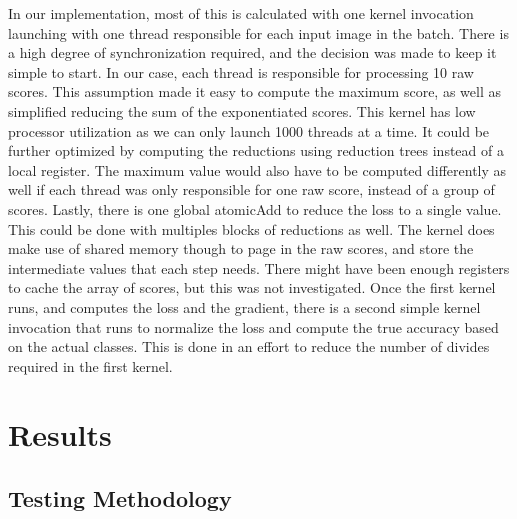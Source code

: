 \documentclass[conference]{IEEEtran}
\begin{document}
In our implementation, most of this is calculated with one kernel invocation launching with one thread responsible for each input image in the batch. There is a high degree of synchronization required, and the decision was made to keep it simple to start. In our case, each thread is responsible for processing 10 raw scores. This assumption made it easy to compute the maximum score, as well as simplified reducing the sum of the exponentiated scores. This kernel has low processor utilization as we can only launch 1000 threads at a time. It could be further optimized by computing the reductions using reduction trees instead of a local register. The maximum value would also have to be computed differently as well if each thread was only responsible for one raw score, instead of a group of scores. Lastly, there is one global atomicAdd to reduce the loss to a single value. This could be done with multiples blocks of reductions as well. The kernel does make use of shared memory though to page in the raw scores, and store the intermediate values that each step needs. There might have been enough registers to cache the array of scores, but this was not investigated. Once the first kernel runs, and computes the loss and the gradient, there is a second simple kernel invocation that runs to normalize the loss and compute the true accuracy based on the actual classes. This is done in an effort to reduce the number of divides required in the first kernel. 

\section{Results}

\subsection{Testing Methodology}
\end{document}
